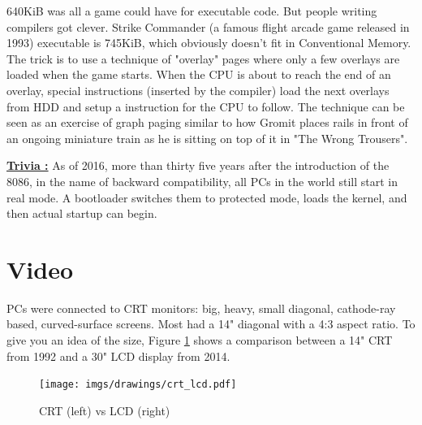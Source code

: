 \documentclass[book.tex]{subfiles}
\begin{document}
\par
{} 640KiB was all a game could have for executable code. But people writing compilers got clever. Strike Commander (a famous flight arcade game released in 1993) executable is 745KiB, which obviously doesn't fit in Conventional Memory. The trick is to use a technique of "overlay" pages where only a few overlays are loaded when the game starts. When the CPU is about to reach the end of an overlay, special instructions (inserted by the compiler) load the next overlays from HDD and setup a  instruction for the CPU to follow. The technique can be seen as an exercise of graph paging similar to how Gromit places rails in front of an ongoing miniature train as he is sitting on top of it in "The Wrong Trousers".\\
\par

\textbf{\underline{Trivia :}}  As of 2016, more than thirty five years after the introduction of the 8086, in the name of backward compatibility, all PCs in the world still start in real mode. A bootloader switches them to protected mode, loads the kernel, and then actual startup can begin.














\section{Video}

PCs were connected to CRT monitors: big, heavy, small diagonal, cathode-ray based, curved-surface screens. Most had a 14" diagonal with a 4:3 aspect ratio. To give you an idea of the size, Figure \ref{fig:lcd_vs_crt} shows a comparison between a 14" CRT from 1992 and a 30" LCD display from 2014.\\

\begin{figure}[H]
\centering
\texttt{[image: imgs/drawings/crt\_lcd.pdf]}
\caption{CRT (left) vs LCD (right)}
\label{fig:lcd_vs_crt}
\end{figure}
\end{document}
